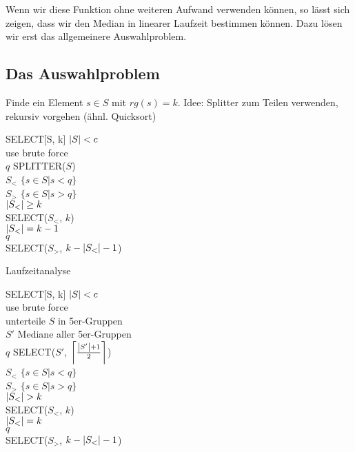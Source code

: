 Wenn wir diese Funktion ohne weiteren Aufwand verwenden können, so lässt sich zeigen,
dass wir den Median in linearer Laufzeit bestimmen können.
Dazu lösen wir erst das allgemeinere Auswahlproblem.

\subsection{Das Auswahlproblem}

Finde ein Element $s \in S$ mit $rg(s) = k$.
Idee: Splitter zum Teilen verwenden, rekursiv vorgehen (ähnl. Quicksort)

\begin{algorithm}{SELECT}[S, k]{
}
\qif $\left|S\right| < c$\\
	\qthen use brute force\\
	\qelse
		$q$ \qlet SPLITTER($S$)\\
		$S_<$ \qlet $\{s \in S | s < q\}$\\
		$S_>$ \qlet $\{s \in S | s > q\}$\\
		\qif $\left|S_<\right| \geq k$\\
			\qthen \qreturn SELECT($S_<$, $k$)\\
			\qelse
				\qif $\left|S_<\right| = k-1$\\
					\qthen \qreturn $q$\\
					\qelse \qreturn SELECT($S_>$, $k-\left|S_<\right|-1$)
				\qfi
		\qfi
\qfi
\end{algorithm}

Laufzeitanalyse





\begin{algorithm}{SELECT}[S, k]{
}
\qif $\left|S\right| < c$\\
	\qthen use brute force\\
	\qelse
		unterteile $S$ in 5er-Gruppen\\
		$S'$ \qlet Mediane aller 5er-Gruppen\\
		$q$ \qlet SELECT($S'$, $\left\lceil{\frac{\left|S'\right|+1}{2}}\right\rceil$)\\
		$S_<$ \qlet $\{s \in S | s < q\}$\\
		$S_>$ \qlet $\{s \in S | s > q\}$\\
		\qif $\left|S_<\right| > k$\\
			\qthen \qreturn SELECT($S_<$, $k$)\\
			\qelse
				\qif $\left|S_<\right| = k$\\
					\qthen \qreturn $q$\\
					\qelse \qreturn SELECT($S_>$, $k-\left|S_<\right|-1$)
				\qfi
		\qfi
\qfi
\end{algorithm}


